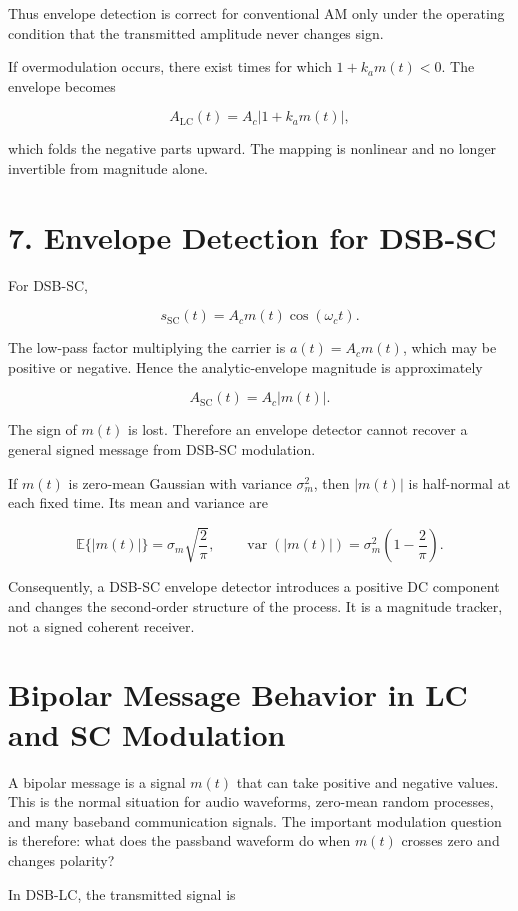 \documentclass[11pt]{article}
\begin{document}
Thus envelope detection is correct for conventional AM only under the operating condition that the transmitted amplitude never changes sign.

If overmodulation occurs, there exist times for which $1+k_a m(t)<0$. The envelope becomes

\[
A_{\mathrm{LC}}(t)=A_c|1+k_a m(t)|,
\]

which folds the negative parts upward. The mapping is nonlinear and no longer invertible from magnitude alone.

\section{7. Envelope Detection for DSB-SC}

For DSB-SC,

\[
s_{\mathrm{SC}}(t)=A_c m(t)\cos(\omega_c t).
\]

The low-pass factor multiplying the carrier is $a(t)=A_c m(t)$, which may be positive or negative. Hence the analytic-envelope magnitude is approximately

\[
A_{\mathrm{SC}}(t)=A_c|m(t)|.
\]

The sign of $m(t)$ is lost. Therefore an envelope detector cannot recover a general signed message from DSB-SC modulation.

If $m(t)$ is zero-mean Gaussian with variance $\sigma_m^2$, then $|m(t)|$ is half-normal at each fixed time. Its mean and variance are

\[
\mathbb{E}\{|m(t)|\}=\sigma_m\sqrt{\frac{2}{\pi}},
\qquad
\operatorname{var}(|m(t)|)=\sigma_m^2\left(1-\frac{2}{\pi}\right).
\]

Consequently, a DSB-SC envelope detector introduces a positive DC component and changes the second-order structure of the process. It is a magnitude tracker, not a signed coherent receiver.

\section{Bipolar Message Behavior in LC and SC Modulation}

A bipolar message is a signal $m(t)$ that can take positive and negative values. This is the normal situation for audio waveforms, zero-mean random processes, and many baseband communication signals. The important modulation question is therefore: what does the passband waveform do when $m(t)$ crosses zero and changes polarity?

In DSB-LC, the transmitted signal is
\end{document}
